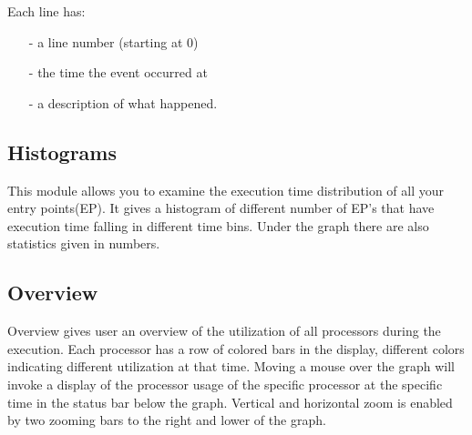 \documentclass[10pt,dvips]{article}
\begin{document}
   Each line has:
   \begin{itemize}
   \item[-] a line number (starting at 0)
   \item[-] the time the event occurred at
   \item[-] a description of what happened.
   \end{itemize}

\subsection{Histograms}

This module allows you to examine the execution time distribution of all your
entry points(EP). It gives a histogram of different number of EP's that have
execution time falling in different time bins. Under the graph there are also
statistics given in numbers.

\subsection{Overview}

Overview gives user an overview of the utilization of all processors during the
execution. Each processor has a row of colored bars in the display, different colors
indicating different utilization at that time. Moving a mouse over the graph
will invoke a display of the processor usage of the specific processor at the
specific time in the status bar below the graph. Vertical and horizontal zoom is
enabled by two zooming bars to the right and lower of the graph.
\end{document}
